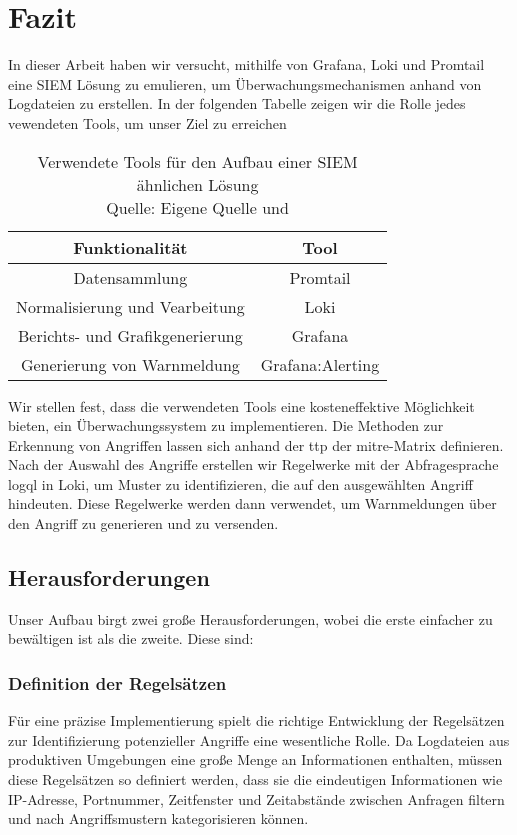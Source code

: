 \section{Fazit}

In dieser Arbeit haben wir versucht, mithilfe von Grafana, Loki und Promtail eine \gls{SIEM} Lösung zu emulieren, um Überwachungsmechanismen anhand von Logdateien zu erstellen. In der folgenden Tabelle zeigen wir die Rolle jedes vewendeten Tools, um unser Ziel zu erreichen

\begin{table}[h]
    \centering
    \begin{tabular}{|c|c|}
    \hline
    \textbf{Funktionalität}         & \textbf{Tool}    \\ \hline
    Datensammlung                   & Promtail         \\ \hline
    Normalisierung und Vearbeitung  & Loki             \\ \hline
    Berichts- und Grafikgenerierung & Grafana          \\ \hline
    Generierung von Warnmeldung     & Grafana:Alerting \\ \hline
    \end{tabular}
    \caption{Verwendete Tools für den Aufbau einer \gls{SIEM} ähnlichen Lösung\\Quelle: Eigene Quelle und \citep{Granadillo_SIEM}}
    \label{tab:my-table}
\end{table}

Wir stellen fest, dass die verwendeten Tools eine kosteneffektive Möglichkeit bieten, ein Überwachungssystem zu implementieren. Die Methoden zur Erkennung von Angriffen lassen sich anhand der \gls{ttp} der \gls{mitre}-Matrix definieren. Nach der Auswahl des Angriffe erstellen wir Regelwerke mit der Abfragesprache \gls{logql} in Loki, um Muster zu identifizieren, die auf den ausgewählten Angriff hindeuten. Diese Regelwerke werden dann verwendet, um Warnmeldungen über den Angriff zu generieren und zu versenden.

\subsection{Herausforderungen}
Unser Aufbau birgt zwei große Herausforderungen, wobei die erste einfacher zu bewältigen ist als die zweite. Diese sind:

\subsubsection{Definition der Regelsätzen}
Für eine präzise Implementierung spielt die richtige Entwicklung der Regelsätzen zur Identifizierung potenzieller Angriffe eine wesentliche Rolle. Da Logdateien aus produktiven Umgebungen eine große Menge an Informationen enthalten, müssen diese Regelsätzen so definiert werden, dass sie die eindeutigen Informationen wie IP-Adresse, Portnummer, Zeitfenster und Zeitabstände zwischen Anfragen filtern und nach Angriffsmustern kategorisieren können.

